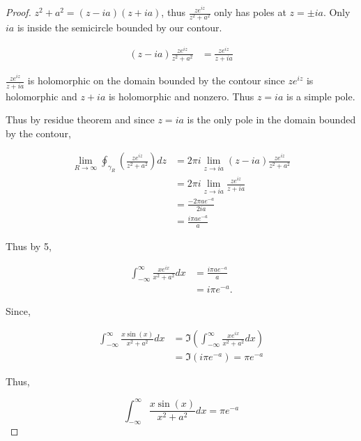\documentclass{article}
\newcommand*{\lm}[1]{\lim_{#1 \to \infty}}
\begin{document}
\begin{proof}
    $z^2 + a^2 = (z - ia)(z + ia)$, thus $\frac{ze^{iz}}{z^2 + a^2}$ only has poles at $z = \pm ia$. Only $ia$ is inside the semicircle bounded by our contour. 
    
    \begin{align*}
        (z - ia)\frac{ze^{iz}}{z^2 + a^2} &= \frac{ze^{iz}}{z + ia}
    \end{align*}

    $\frac{ze^{iz}}{z + ia}$ is holomorphic on the domain bounded by the contour since $ze^{iz}$ is holomorphic and $z + ia$ is holomorphic and nonzero. Thus $z = ia$ is a simple pole. 
    
    
    Thus by residue theorem and since $z = ia$ is the only pole in the domain bounded by the contour, 

    \begin{align*}
        \lm{R} \oint_{\gamma_R} \left(\frac{ze^{iz}}{z^2 + a^2}\right) dz 
        &= 2 \pi i \lim_{z \to ia} (z - ia) \frac{z e^{iz}}{z^2 + a^2} \\
        &= 2 \pi i \lim_{z \to ia} \frac{z e^{iz}}{z + ia} \\
        &= \frac{-2 \pi a e^{-a}}{2ia} \\
        &= \frac{i\pi a e^{-a}}{a}
    \end{align*}

    Thus by 5, 

    \begin{align*}
        \int_{-\infty}^{\infty} \frac{x e^{ix}}{x^2 + a^2} dx &= \frac{i\pi a e^{-a}}{a} \\
        &= i \pi e^{-a}.
    \end{align*}

    Since, 

    \begin{align*}
        \int_{-\infty}^{\infty} \frac{x \sin(x)}{x^2 + a^2} dx &= \Im{\left(\int_{-\infty}^{\infty} \frac{x e^{ix}}{x^2 + a^2}dx\right)} \\
        &= \Im{(i\pi e^{-a})} = \pi e^{-a}
    \end{align*}

    Thus, 

    \begin{equation}
        \int_{-\infty}^{\infty} \frac{x \sin(x)}{x^2 + a^2} dx = \pi e^{-a}
    \end{equation}

\end{proof}

\bigskip
\end{document}
